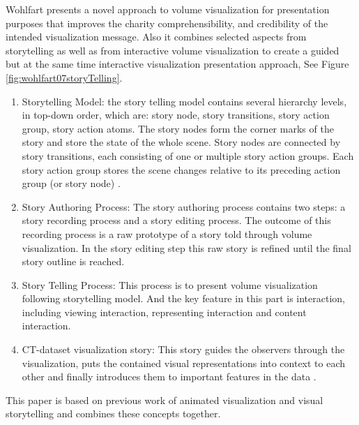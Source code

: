 \documentclass{egpubl}
\begin{document}
Wohlfart presents a novel approach to volume visualization for presentation purposes that improves the charity
comprehensibility, and credibility of the intended visualization message. Also it combines selected aspects from storytelling as well as from interactive volume visualization to create a guided but at the same time interactive visualization presentation approach, See Figure \ref{fig:wohlfart07storyTelling}\cite{wohlfart2}.
\begin{enumerate}
\item Storytelling Model: the story telling model contains  several hierarchy levels, in top-down order, which are: story node, story transitions, story action group, story action atoms. The story nodes form the corner marks of the story and store the state of the whole scene. Story nodes are connected by story transitions, each consisting of one or multiple story action groups. Each story action group stores the scene changes relative to its preceding action group (or story node) \cite{wohlfart2}.

\item Story Authoring Process: The story authoring process contains two steps: a story recording process and a story editing process. The outcome of this recording process is a raw prototype of a story told through volume visualization. In the story editing step this raw story is refined until the final story outline is reached.\cite{wohlfart2}
\item Story Telling Process: This process is to present volume visualization following storytelling model. And the key feature in this part is interaction, including viewing interaction, representing interaction and content interaction.\cite{wohlfart2}
\item CT-dataset visualization story: This story guides the observers through the visualization, puts the contained visual representations
into context to each other and finally introduces them to important features in the data \cite{wohlfart2}.

\end{enumerate}
This paper is based on previous work of animated visualization \cite{iserhardt} and visual storytelling \cite{tiede} and combines these concepts together.
\end{document}
